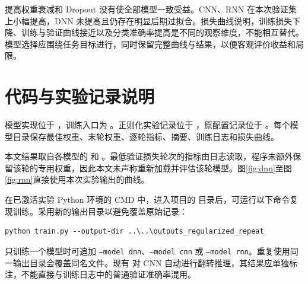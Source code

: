 \documentclass[UTF8,a4paper,zihao=-4,fontset=fandol]{ctexart}
\begin{document}
提高权重衰减和 Dropout 没有使全部模型一致受益。CNN、RNN 在本次验证集上小幅提高，DNN 未提高且仍存在明显后期过拟合。损失曲线说明，训练损失下降、训练与验证曲线接近以及分类准确率提高是不同的观察维度，不能相互替代。模型选择应围绕任务目标进行，同时保留完整曲线与结果，以便客观评价收益和局限。

\appendix
\section{代码与实验记录说明}
模型实现位于 ，训练入口为 。正则化实验记录位于 ，原配置记录位于 。每个模型目录保存最佳权重、末轮权重、逐轮指标、摘要、训练日志和损失曲线。

本文结果取自各模型的  和 。最低验证损失轮次的指标由日志读取，程序未额外保留该轮的专用权重，因此本文未声称重新加载并评估该轮模型。图\ref{fig:dnn}至图\ref{fig:rnn}直接使用本次实验输出的曲线。

在已激活实验 Python 环境的 CMD 中，进入项目的  目录后，可运行以下命令复现训练。采用新的输出目录以避免覆盖原始记录：
\begin{verbatim}
python train.py --output-dir ..\..\outputs_regularized_repeat
\end{verbatim}
只训练一个模型时可追加 \texttt{--model dnn}、\texttt{--model cnn} 或 \texttt{--model rnn}。重复使用同一输出目录会覆盖同名文件。现有  对 CNN 自动进行翻转推理，其结果应单独标注，不能直接与训练日志中的普通验证准确率混用。
\end{document}
